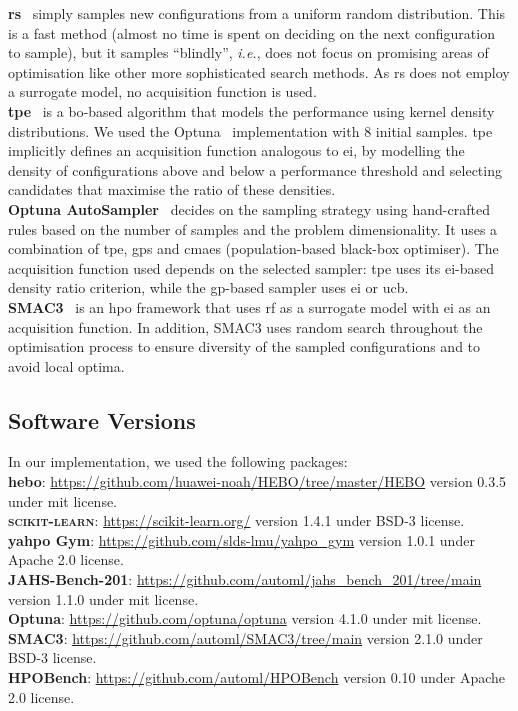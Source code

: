 \textbf{\Gls{rs}}~\citep{BerBen12} simply samples new configurations from a uniform random distribution. This is a fast method (almost no time is spent on deciding on the next configuration to sample), but it samples ``blindly'', \emph{i.e.}, does not focus on promising areas of optimisation like other more sophisticated search methods. As \gls{rs} does not employ a surrogate model, no acquisition function is used.\\
    \textbf{\Gls{tpe}}~\citep{BerEtAl11} is a \gls{bo}-based algorithm that models the performance using kernel density distributions. We used the Optuna~\citep{AkiEtAl19} implementation with 8 initial samples. \gls{tpe} implicitly defines an acquisition function analogous to \gls{ei}, by modelling
    the density of configurations above and below a performance threshold and selecting candidates that maximise the ratio of these densities.\\
    \textbf{Optuna AutoSampler}~\citep{Ozaki24} decides on the sampling strategy using hand-crafted rules based on the number of samples and the problem dimensionality. It uses a combination of \gls{tpe}, \glspl{gp} and \gls{cmaes} (population-based black-box optimiser). The acquisition function used depends on the selected sampler: \gls{tpe} uses its \gls{ei}-based density ratio criterion, while the \gls{gp}-based sampler uses \gls{ei} or \gls{ucb}.\\
    \textbf{SMAC3}~\citep{LinEtAl22b} is an \gls{hpo} framework that uses \gls{rf} as a surrogate model with \gls{ei} as an acquisition function. In addition, SMAC3 uses random search throughout the optimisation process to ensure diversity of the sampled configurations and to avoid local optima.

\subsection{Software Versions}
In our implementation, we used the following packages:\\
\textbf{\gls{hebo}}: \url{https://github.com/huawei-noah/HEBO/tree/master/HEBO} version 0.3.5 under \gls{mit} license.\\
    \textbf{\textsc{scikit-learn}}: \url{https://scikit-learn.org/} version 1.4.1 under BSD-3 license.\\
    \textbf{\gls{yahpo} Gym}: \url{https://github.com/slds-lmu/yahpo_gym} version 1.0.1 under Apache 2.0 license.\\
    \textbf{JAHS-Bench-201}: \url{https://github.com/automl/jahs_bench_201/tree/main} version 1.1.0 under \gls{mit} license.\\
    \textbf{Optuna}: \url{https://github.com/optuna/optuna} version 4.1.0 under \gls{mit} license.\\
    \textbf{SMAC3}: \url{https://github.com/automl/SMAC3/tree/main} version 2.1.0 under BSD-3 license.\\
    \textbf{HPOBench}: \url{https://github.com/automl/HPOBench} version 0.10 under Apache 2.0 license.

